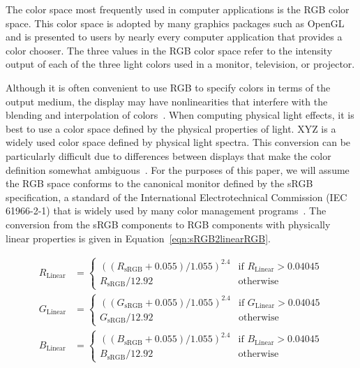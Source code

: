 \documentclass[review,journal]{vgtc}         %
\newcommand{\lcite}[1]{~\cite{#1}}
\newcommand{\RGB}{RGB\xspace}
\newcommand{\XYZ}{XYZ\xspace}
\begin{document}
The color space most frequently used in computer applications is the \RGB
color space.  This color space is adopted by many graphics packages such as
OpenGL and is presented to users by nearly every computer application
that provides a color chooser.  The three values in the \RGB
color space refer to the intensity output of each of the three light colors
used in a monitor, television, or projector.

Although it is often convenient to use \RGB to specify colors in terms of
the output medium, the display may have nonlinearities that interfere with
the blending and interpolation of colors\lcite{Stone03}.  When computing
physical light effects, it is best to use a color space defined by the
physical properties of light.  \XYZ is a widely used color space defined by
physical light spectra.  This conversion can be particularly difficult due
to differences between displays that make the color definition somewhat
ambiguous\lcite{Fortner97}.  For the purposes of this paper, we will assume
the \RGB space conforms to the canonical monitor defined by the sRGB
specification, a standard of the International Electrotechnical Commission
(IEC 61966-2-1) that is widely used by many color management
programs\lcite{Stone03}.  The conversion from the sRGB components to \RGB
components with physically linear properties is given in Equation~\ref{eqn:sRGB2linearRGB}.

\begin{equation}
  \begin{split}
    R_\mathrm{Linear} &=
    \begin{cases}
      \left((R_\mathrm{sRGB}+0.055)/1.055\right)^{2.4}
      & \text{if $R_\mathrm{Linear} > 0.04045$} \\
      R_{\mathrm{sRGB}}/12.92 & \text{otherwise}
    \end{cases} \\
    G_\mathrm{Linear} &=
    \begin{cases}
      \left((G_\mathrm{sRGB}+0.055)/1.055\right)^{2.4}
      & \text{if $G_\mathrm{Linear} > 0.04045$} \\
      G_{\mathrm{sRGB}}/12.92 & \text{otherwise}
    \end{cases} \\
    B_\mathrm{Linear} &=
    \begin{cases}
      \left((B_\mathrm{sRGB}+0.055)/1.055\right)^{2.4}
      & \text{if $B_\mathrm{Linear} > 0.04045$} \\
      B_{\mathrm{sRGB}}/12.92 & \text{otherwise}
    \end{cases} 
  \end{split}
  \label{eqn:sRGB2linearRGB}
\end{equation}
\end{document}
